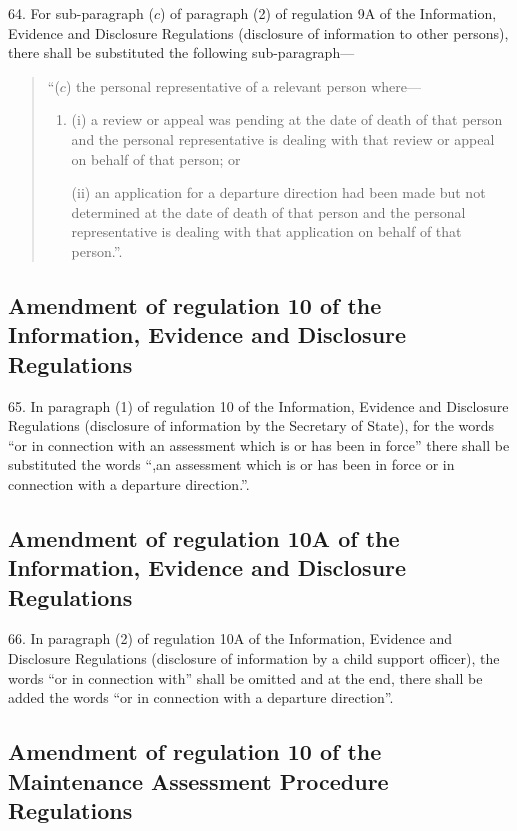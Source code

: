 \documentclass[a4paper]{article}
\begin{document}
64. For sub-paragraph ($c$) of paragraph (2) of regulation 9A of the
Information, Evidence and Disclosure Regulations (disclosure of information to
other persons), there shall be substituted the following sub-paragraph—
\begin{quotation}
“($c$) the personal representative of a relevant person where—
\begin{enumerate}\item[]
(i) a review or appeal was pending at the date of death of that person and the
personal representative is dealing with that review or appeal on behalf of that
person; or

(ii) an application for a departure direction had been made but not determined at
the date of death of that person and the personal representative is dealing with
that application on behalf of that person.”.
\end{enumerate}
\end{quotation}

\subsection[65. Amendment of regulation 10 of the Information, Evidence and Disclosure
Regulations]{Amendment of regulation 10 of the Information, Evidence and Disclosure
Regulations}

65. In paragraph (1) of regulation 10 of the Information, Evidence
and Disclosure Regulations (disclosure of information by the Secretary of
State), for the words “or in connection with an assessment which is or has been
in force” there shall be substituted the words “,an assessment which is or has
been in force or in connection with a departure direction.”.

\subsection[66. Amendment of regulation 10A of the Information, Evidence and Disclosure
Regulations]{Amendment of regulation 10A of the Information, Evidence and Disclosure
Regulations}

66. In paragraph (2) of regulation 10A of the Information, Evidence
and Disclosure Regulations (disclosure of information by a child support
officer), the words “or in connection with” shall be omitted and at the end,
there shall be added the words “or in connection with a departure direction”.

\subsection[67. Amendment of regulation 10 of the Maintenance Assessment Procedure
Regulations]{Amendment of regulation 10 of the Maintenance Assessment Procedure
Regulations}
\end{document}
